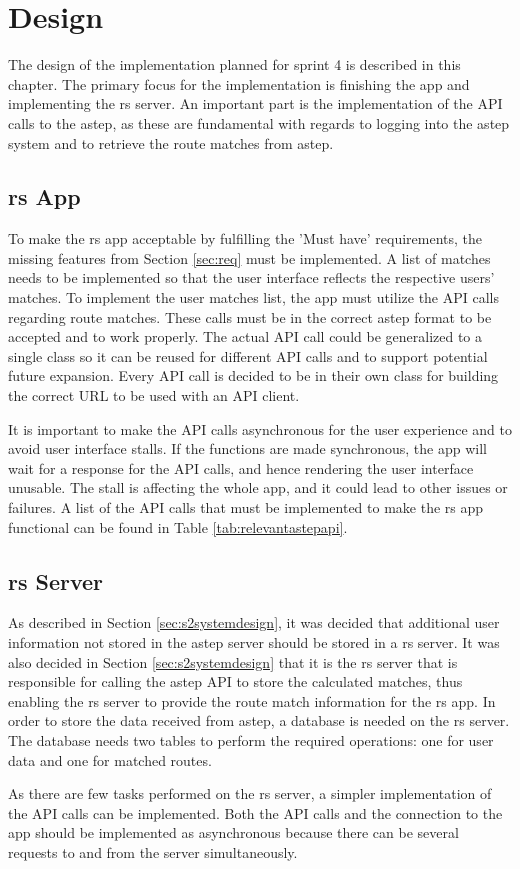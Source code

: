 \section{Design}
The design of the implementation planned for sprint 4 is described in this chapter.
The primary focus for the implementation is finishing the app and implementing the \gls{rs} server.
An important part is the implementation of the API calls to the \gls{astep}, as these are fundamental with regards to logging into the \gls{astep} system and to retrieve the route matches from \gls{astep}.

\subsection{\gls{rs} App}
To make the \gls{rs} app acceptable by fulfilling the 'Must have' requirements, the missing features from Section \ref{sec:req} must be implemented.
A list of matches needs to be implemented so that the user interface reflects the respective users' matches.
To implement the user matches list, the app must utilize the API calls regarding route matches.
These calls must be in the correct \gls{astep} format to be accepted and to work properly.
The actual API call could be generalized to a single class so it can be reused for different API calls and to support potential future expansion.
Every API call is decided to be in their own class for building the correct URL to be used with an API client.

It is important to make the API calls asynchronous for the user experience and to avoid user interface stalls. 
If the functions are made synchronous, the app will wait for a response for the API calls, and hence rendering the user interface unusable.
The stall is affecting the whole app, and it could lead to other issues or failures.
A list of the API calls that must be implemented to make the \gls{rs} app functional can be found in Table \ref{tab:relevantastepapi}.

\subsection{\gls{rs} Server}
As described in Section \ref{sec:s2systemdesign}, it was decided that additional user information not stored in the \gls{astep} server should be stored in a \gls{rs} server.
It was also decided in Section \ref{sec:s2systemdesign} that it is the \gls{rs} server that is responsible for calling the \gls{astep} API to store the calculated matches, thus enabling the \gls{rs} server to provide the route match information for the \gls{rs} app.
In order to store the data received from \gls{astep}, a database is needed on the \gls{rs} server.
The database needs two tables to perform the required operations: one for user data and one for matched routes.

As there are few tasks performed on the \gls{rs} server, a simpler implementation of the API calls can be implemented.
Both the API calls and the connection to the app should be implemented as asynchronous because there can be several requests to and from the server simultaneously. 